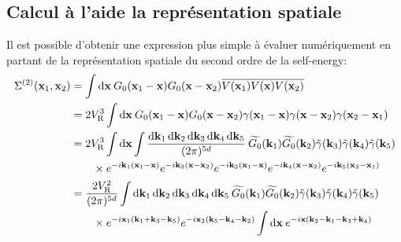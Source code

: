 \subsection{Calcul à l'aide la représentation spatiale}
Il est possible d'obtenir une expression plus simple à évaluer numériquement en partant de la représentation spatiale du second ordre de la self-energy:
\begin{align}
\Sigma^{(2)}(\mathbf{x}_{\mathrm{1}},\mathbf{x}_{\mathrm{2}}) &= \int{\diff \mathbf{x} \: G_0(\mathbf{x}_{\mathrm{1}} - \mathbf{x}) G_0(\mathbf{x}-\mathbf{x}_{\mathrm{2}}) \overline{V(\mathbf{x}_{\mathrm{1}})V(\mathbf{x})V(\mathbf{x}_{\mathrm{2}})}} \\
&=2 \VR^3 \int{\diff\mathbf{x} \: G_0(\mathbf{x}_{\mathrm{1}} - \mathbf{x}) G_0(\mathbf{x}-\mathbf{x}_{\mathrm{2}}) \gamma(\mathbf{x}_{\mathrm{1}}-\mathbf{x})\gamma(\mathbf{x}-\mathbf{x}_{\mathrm{2}})\gamma(\mathbf{x}_{\mathrm{2}}-\mathbf{x}_{\mathrm{1}})} \\
&=2 \VR^3 \int{\diff\mathbf{x} \int{\frac{\diff\mathbf{k}_{\mathrm{1}}\diff\mathbf{k}_{\mathrm{2}}\diff\mathbf{k}_{\mathrm{3}}\diff\mathbf{k}_{\mathrm{4}}\diff\mathbf{k}_{\mathrm{5}}}{(2\pi)^{5d}}\: \widetilde{G_0}(\mathbf{k}_{\mathrm{1}}) \widetilde{G_0}(\mathbf{k}_{\mathrm{2}}) \tilde{\gamma}(\mathbf{k}_{\mathrm{3}})\tilde{\gamma}(\mathbf{k}_{\mathrm{4}})\tilde{\gamma}(\mathbf{k}_{\mathrm{5}}) }} \\
&\nonumber \qquad\times e^{-i\mathbf{k}_{\mathrm{1}}(\mathbf{x}_{\mathrm{1}}-\mathbf{x})} e^{-i\mathbf{k}_{\mathrm{2}}(\mathbf{x}-\mathbf{x}_{\mathrm{2}})} e^{-i\mathbf{k}_{\mathrm{3}}(\mathbf{x}_{\mathrm{1}}-\mathbf{x})} e^{-i\mathbf{k}_{\mathrm{4}}(\mathbf{x}-\mathbf{x}_{\mathrm{2}})} e^{-i\mathbf{k}_{\mathrm{5}}(\mathbf{x}_{\mathrm{2}}-\mathbf{x}_{\mathrm{1}})} \\
&= \frac{2\VR^2}{(2\pi)^{5d}} \int{\diff\mathbf{k}_{\mathrm{1}}\diff\mathbf{k}_{\mathrm{2}}\diff\mathbf{k}_{\mathrm{3}}\diff\mathbf{k}_{\mathrm{4}}\diff\mathbf{k}_{\mathrm{5}}\: \widetilde{G_0}(\mathbf{k}_{\mathrm{1}}) \widetilde{G_0}(\mathbf{k}_{\mathrm{2}}) \tilde{\gamma}(\mathbf{k}_{\mathrm{3}})\tilde{\gamma}(\mathbf{k}_{\mathrm{4}})\tilde{\gamma}(\mathbf{k}_{\mathrm{5}})}\\
&\nonumber \qquad \times e^{-i\mathbf{x}_{\mathrm{1}} (\mathbf{k}_{\mathrm{1}}+\mathbf{k}_{\mathrm{3}}-\mathbf{k}_{\mathrm{5}})} e^{-i\mathbf{x}_{\mathrm{2}}(\mathbf{k}_{\mathrm{5}}-\mathbf{k}_{\mathrm{4}}-\mathbf{k}_{\mathrm{2}})} \int{\diff\mathbf{x}\: e^{-i\mathbf{x}(\mathbf{k}_{\mathrm{2}}-\mathbf{k}_{\mathrm{1}}-\mathbf{k}_{\mathrm{3}}+\mathbf{k}_{\mathrm{4}})}}\\

\end{align}
